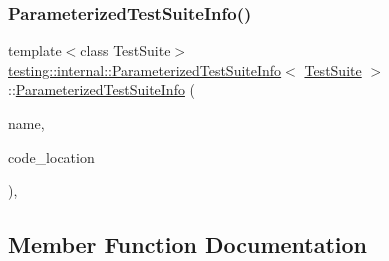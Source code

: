 \subsubsection{\texorpdfstring{ParameterizedTestSuiteInfo()}{ParameterizedTestSuiteInfo()}\hspace{0.1cm}{\footnotesize\ttfamily [2/2]}}
{\footnotesize\ttfamily template$<$class Test\+Suite$>$ \\
\mbox{\hyperlink{classtesting_1_1internal_1_1_parameterized_test_suite_info}{testing\+::internal\+::\+Parameterized\+Test\+Suite\+Info}}$<$ \mbox{\hyperlink{classtesting_1_1_test_suite}{Test\+Suite}} $>$\+::\mbox{\hyperlink{classtesting_1_1internal_1_1_parameterized_test_suite_info}{Parameterized\+Test\+Suite\+Info}} (\begin{DoxyParamCaption}\item[{const char $\ast$}]{name,  }\item[{\mbox{\hyperlink{structtesting_1_1internal_1_1_code_location}{Code\+Location}}}]{code\+\_\+location }\end{DoxyParamCaption})\hspace{0.3cm}{\ttfamily [inline]}, {\ttfamily [explicit]}}



\subsection{Member Function Documentation}
\mbox{\label{classtesting_1_1internal_1_1_parameterized_test_suite_info_a07445ac68713383f38747e1c56c6a04a}} 
